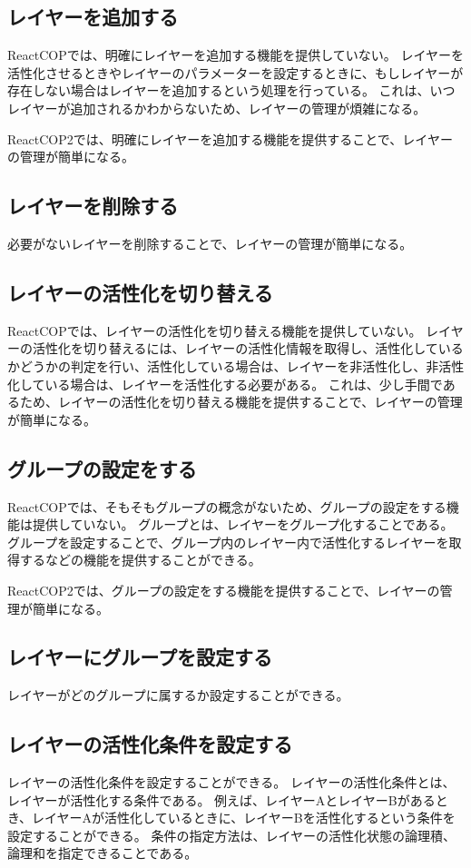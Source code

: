 \documentclass{jsarticle}
\begin{document}
\subsection{レイヤーを追加する}
ReactCOPでは、明確にレイヤーを追加する機能を提供していない。
レイヤーを活性化させるときやレイヤーのパラメーターを設定するときに、もしレイヤーが存在しない場合はレイヤーを追加するという処理を行っている。
これは、いつレイヤーが追加されるかわからないため、レイヤーの管理が煩雑になる。

ReactCOP2では、明確にレイヤーを追加する機能を提供することで、レイヤーの管理が簡単になる。

\subsection{レイヤーを削除する}
必要がないレイヤーを削除することで、レイヤーの管理が簡単になる。

\subsection{レイヤーの活性化を切り替える}
ReactCOPでは、レイヤーの活性化を切り替える機能を提供していない。
レイヤーの活性化を切り替えるには、レイヤーの活性化情報を取得し、活性化しているかどうかの判定を行い、活性化している場合は、レイヤーを非活性化し、非活性化している場合は、レイヤーを活性化する必要がある。
これは、少し手間であるため、レイヤーの活性化を切り替える機能を提供することで、レイヤーの管理が簡単になる。

\subsection{グループの設定をする}
ReactCOPでは、そもそもグループの概念がないため、グループの設定をする機能は提供していない。
グループとは、レイヤーをグループ化することである。
グループを設定することで、グループ内のレイヤー内で活性化するレイヤーを取得するなどの機能を提供することができる。

ReactCOP2では、グループの設定をする機能を提供することで、レイヤーの管理が簡単になる。

\subsection{レイヤーにグループを設定する}
レイヤーがどのグループに属するか設定することができる。

\subsection{レイヤーの活性化条件を設定する}
レイヤーの活性化条件を設定することができる。
レイヤーの活性化条件とは、レイヤーが活性化する条件である。
例えば、レイヤーAとレイヤーBがあるとき、レイヤーAが活性化しているときに、レイヤーBを活性化するという条件を設定することができる。
条件の指定方法は、レイヤーの活性化状態の論理積、論理和を指定できることである。
\end{document}
